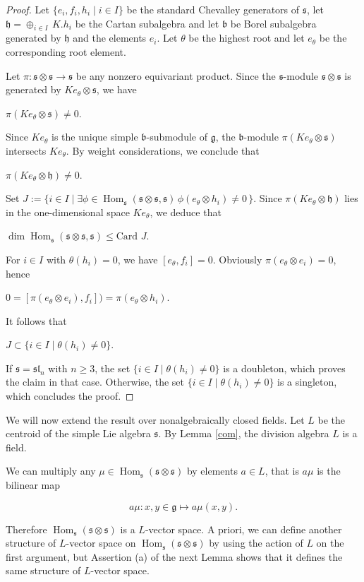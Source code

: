 \documentclass[11pt, letterpaper, reqno]{amsart}
\theoremstyle{definition}
\newcommand{\Hom}{\operatorname{Hom}}
\newcommand{\fsl}{\mathfrak{sl}}
\newcommand{\fb}{\mathfrak{b}}
\newcommand{\fg}{\mathfrak{g}}
\newcommand{\fh}{\mathfrak{h}}
\newcommand{\fs}{\mathfrak{s}}
\newcommand{\Card}{\mathrm{Card\,}}
\begin{document}
\begin{proof} Let $\{e_i, f_i, h_i\mid i\in I\}$ be the standard Chevalley
generators of $\fs$, let 
$\fh=\oplus_{i\in I}\,K.h_i$ be the Cartan subalgebra and let
$\fb$ be   Borel subalgebra generated by
$\fh$ and the elements $e_i$. Let $\theta$ be the highest root
and let $e_\theta$ be the corresponding root element.

Let  $\pi:\fs\otimes\fs\to\fs$  be any nonzero equivariant product. Since the $\fs$-module $\fs\otimes \fs$ is generated by $Ke_\theta\otimes\fs$, we have

\centerline{$\pi(Ke_\theta\otimes\fs)\neq 0$.}

\noindent  Since
$Ke_\theta$ is the unique simple $\fb$-submodule of $\fg$,
the $\fb$-module $\pi(Ke_\theta\otimes\fs)$  intersects $Ke_\theta$. By weight considerations, we conclude that

\centerline{$\pi(Ke_\theta\otimes\fh)\neq 0$.}

Set $J:=\{i\in I\mid \exists \phi\in 
\Hom_\fs(\fs\otimes\fs,\fs) \,
\phi(e_\theta\otimes h_i)\neq 0 \,  \}$.
Since  $\pi(Ke_\theta\otimes\fh)$ lies in the one-dimensional space $K e_\theta$, we deduce that

\centerline{$\dim \Hom_\fs(\fs\otimes\fs,\fs)
\leq \Card \,J$.}

\noindent For $i\in I$ with $\theta(h_i)=0$, we have $[e_\theta,f_i]=0$. Obviously
 $\pi(e_\theta\otimes e_i)=0$, hence

\centerline{$0=[\pi(e_\theta\otimes e_i), f_i])=
\pi(e_\theta\otimes h_i)$.}

\noindent It follows that

\centerline{$J\subset \{i\in I\mid \theta(h_i)\neq 0\}$.}
  
If $\fs=\fsl_n$ with $n\geq 3$, the set 
$\{i\in I\mid \theta(h_i)\neq 0\}$ is a doubleton,
which proves the claim in that case. Otherwise,
the set 
$\{i\in I\mid \theta(h_i)\neq 0\}$ is a singleton,
which concludes the proof.
\end{proof}

We will now extend the result over 
nonalgebraically closed fields. Let $L$ be the centroid of the simple Lie algebra $\fs$. By Lemma \ref{com}, the division algebra $L$ is a field. 


We can multiply any
$\mu\in \Hom_\fs(\fs\otimes\fs)$ by elements  $a\in L$, that is  $a\mu$ is the bilinear map

$$a\mu:x,y\in\fg\mapsto a\mu(x,y).$$

\noindent Therefore $\Hom_\fs(\fs\otimes\fs)$ is a $L$-vector space. A priori, we can define
another structure of $L$-vector space on
$\Hom_\fs(\fs\otimes\fs)$ by using the action of $L$ on the first argument, but Assertion (a)
of the next Lemma shows that it defines the same structure of $L$-vector space.
\end{document}
